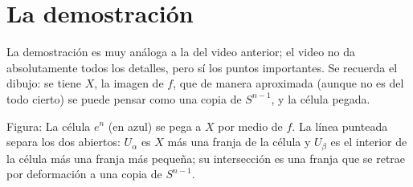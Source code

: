 \documentclass[11pt]{article}
\begin{document}
\section*{La demostración}

La demostración es muy análoga a la del video anterior; el video no da absolutamente todos los detalles, pero sí los puntos importantes. Se recuerda el dibujo: se tiene $X$, la imagen de $f$, que de manera aproximada (aunque no es del todo cierto) se puede pensar como una copia de $S^{n-1}$, y la célula pegada.

\begin{center}
\end{center}

\noindent Figura: La célula $e^n$ (en azul) se pega a $X$ por medio de $f$. La línea punteada separa los dos abiertos: $U_\alpha$ es $X$ más una franja de la célula y $U_\beta$ es el interior de la célula más una franja más pequeña; su intersección es una franja que se retrae por deformación a una copia de $S^{n-1}$.
\end{document}
